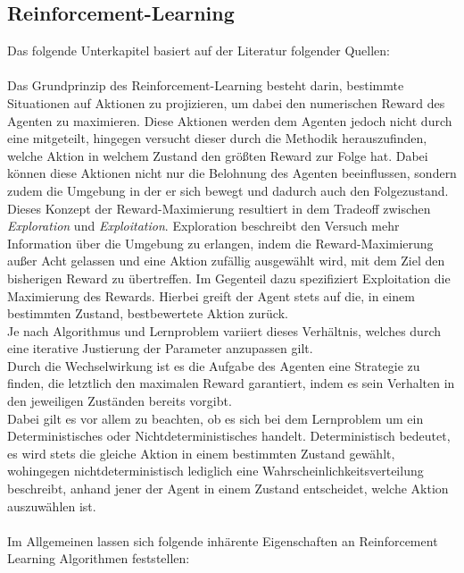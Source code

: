 \subsection{Reinforcement-Learning}
\label{subsec:rl}
Das folgende Unterkapitel basiert auf der Literatur folgender Quellen: \cite{MultiagentSystems,mlmitchel,Sutton}\\\\
Das Grundprinzip des Reinforcement-Learning besteht darin, bestimmte Situationen auf Aktionen zu projizieren, um dabei den numerischen Reward des Agenten zu maximieren. Diese Aktionen werden dem Agenten jedoch nicht durch eine  mitgeteilt, hingegen versucht dieser durch die  Methodik herauszufinden, welche Aktion in welchem Zustand  den größten Reward zur Folge hat. Dabei können diese Aktionen nicht nur die Belohnung des Agenten beeinflussen, sondern zudem die Umgebung in der er sich bewegt und dadurch auch den Folgezustand. \\
Dieses Konzept der Reward-Maximierung resultiert in dem Tradeoff zwischen \textit{Exploration} und \textit{Exploitation}. Exploration beschreibt den Versuch mehr Information über die Umgebung zu erlangen, indem die Reward-Maximierung außer Acht gelassen und eine Aktion zufällig ausgewählt wird, mit dem Ziel den bisherigen Reward zu übertreffen. Im Gegenteil dazu spezifiziert Exploitation die Maximierung des Rewards. Hierbei greift der Agent stets auf die, in einem bestimmten Zustand, bestbewertete Aktion zurück.\\
Je nach Algorithmus und Lernproblem variiert dieses Verhältnis, welches durch eine iterative Justierung der Parameter anzupassen gilt. \\
Durch die Wechselwirkung ist es die Aufgabe des Agenten eine Strategie zu finden, die letztlich den maximalen Reward garantiert, indem es sein Verhalten in den jeweiligen Zuständen bereits vorgibt. \\
Dabei gilt es vor allem zu beachten, ob es sich bei dem Lernproblem um ein Deterministisches oder Nichtdeterministisches handelt. Deterministisch bedeutet, es wird stets die gleiche Aktion in einem bestimmten Zustand gewählt, wohingegen nichtdeterministisch lediglich eine Wahrscheinlichkeitsverteilung beschreibt, anhand jener der Agent in einem Zustand entscheidet, welche Aktion auszuwählen ist.\\\\
Im Allgemeinen lassen sich folgende inhärente Eigenschaften an Reinforcement Learning Algorithmen feststellen:
